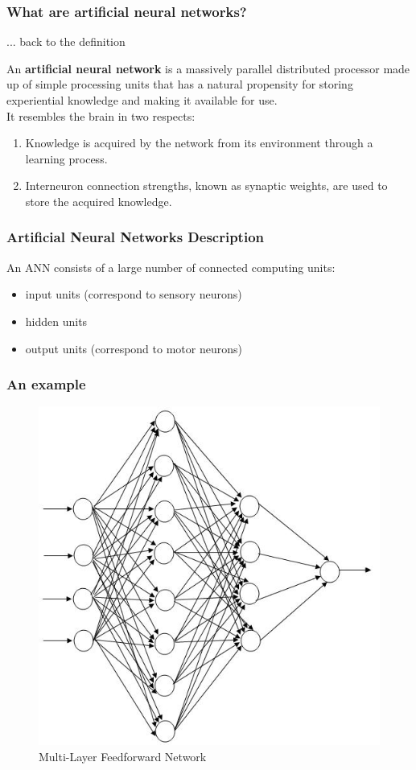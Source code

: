 \begin{frame}
  \frametitle{What are artificial neural networks?}
  ... back to the definition
  \begin{definition}
    An \textbf{artificial neural network} is a \pause
    \alert<2>{massively parallel distributed} processor \pause made up
    of \alert<3>{simple} processing units \pause that has a natural
    propensity for storing \alert<4>{experiential knowledge} and
    making it available for use.\pause\\It resembles the brain in two
    respects:
    \begin{enumerate}
    \item Knowledge is acquired by the network from its environment
      through a \alert<5>{learning} process.\pause
    \item Interneuron connection strengths, known as synaptic weights,
      are used to store the acquired knowledge.
    \end{enumerate}
    \cite[page 2]{haykin2009neural}
  \end{definition}
\end{frame}

\begin{frame}
  \frametitle{Artificial Neural Networks Description}%
  An ANN consists of a large number of connected computing units:
  \begin{itemize}
  \item input units (correspond to sensory neurons)
  \item hidden units
  \item output units (correspond to motor neurons)
  \end{itemize}
\end{frame}

\begin{frame}
  \frametitle{An example}
  \begin{figure}[h!]
    \centering
    \includegraphics[width=.5\textwidth]{graphics/mlp.jpg}
    \caption{Multi-Layer Feedforward Network}
  \end{figure}
\end{frame}

